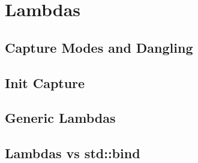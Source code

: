 \section{Lambdas}\label{sec:lambdas}

\subsection{Capture Modes and Dangling}

\subsection{Init Capture}

\subsection{Generic Lambdas}

\subsection{Lambdas vs std::bind}

